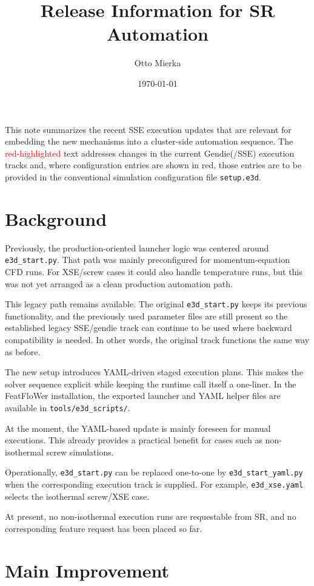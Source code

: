 \documentclass[11pt,a4paper]{article}
\title{Release Information for SR Automation}
\author{Otto Mierka}
\date{\today}
\begin{document}
\maketitle

This note summarizes the recent SSE execution updates that are relevant for embedding the new mechanisms into a
cluster-side automation sequence. The \textcolor{red}{red-highlighted} text addresses changes in the current
Gendie(/SSE) execution tracks and, where configuration entries are shown in red, those entries are to be provided
in the conventional simulation configuration file \texttt{setup.e3d}.

\section*{Background}

Previously, the production-oriented launcher logic was centered around \texttt{e3d\_start.py}. That path was mainly
preconfigured for momentum-equation CFD runs. For XSE/screw cases it could also handle temperature runs, but this
was not yet arranged as a clean production automation path.

This legacy path remains available. The original \texttt{e3d\_start.py} keeps its previous functionality, and the
previously used parameter files are still present so the established legacy SSE/gendie track can continue to be
used where backward compatibility is needed. In other words, the original track functions the same way as before.

The new setup introduces YAML-driven staged execution plans. This makes the solver sequence explicit while keeping
the runtime call itself a one-liner. In the FeatFloWer installation, the exported launcher and YAML helper files
are available in \texttt{tools/e3d\_scripts/}.

At the moment, the YAML-based update is mainly foreseen for manual executions. This already provides a practical
benefit for cases such as non-isothermal screw simulations.

Operationally, \texttt{e3d\_start.py} can be replaced one-to-one by \texttt{e3d\_start\_yaml.py} when the
corresponding execution track is supplied. For example, \texttt{e3d\_xse.yaml} selects the isothermal screw/XSE
case.

At present, no non-isothermal execution runs are requestable from SR, and no corresponding feature request has been
placed so far.

\section*{Main Improvement}
\end{document}
